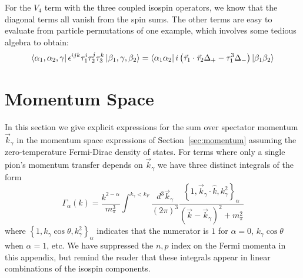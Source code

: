 For the $V_4$ term with the three coupled isospin operators, we know that the diagonal terms all vanish from the spin sums. The other terms are easy to evaluate from particle permutations of one example, which involves some tedious algebra to obtain:
\begin{equation}
\bra{ \alpha_1, \alpha_2, \gamma }\epsilon^{ijk}\tau_1^i\tau_2^j\tau_3^k \ket{\beta_1, \gamma, \beta_2}  
= \bra{\alpha_1 \alpha_2} i \left(\vec{\tau}_1\cdot\vec{\tau}_2\Delta_+-\tau_1^3\Delta_- \right) \ket{\beta_1 \beta_2}
\end{equation}


\section{\label{app:momSums}Momentum Space}

In this section we give explicit expressions for the sum over spectator momentum $\vec{k}_\gamma$ in the momentum space expressions of Section~\ref{sec:momentum} assuming the zero-temperature Fermi-Dirac density of states. For terms where only a single pion's momentum transfer depends on $\vec{k}_\gamma$ we have three distinct integrals of the form 
\begin{equation}
\Gamma_{\alpha}(k) = \frac{k^{2-\alpha}}{m_\pi^3}\int^{k_\gamma<k_F}\frac{d^3\vec{k}_\gamma}{(2\pi)^3}  \frac{\left\{1,\vec{k}_\gamma\cdot\hat{k},k_\gamma^2\right\}_\alpha}{(\vec{k}-\vec{k}_\gamma)^2+m_\pi^2}
\end{equation}
where $\left\{1,k_\gamma\cos\theta,k_\gamma^2\right\}_\alpha$ indicates that the numerator is $1$ for $\alpha=0$, $k_\gamma\cos\theta$ when $\alpha=1$, etc. We have suppressed the $n,p$ index on the Fermi momenta in this appendix, but remind the reader that these integrals appear in linear combinations of the isospin components.

